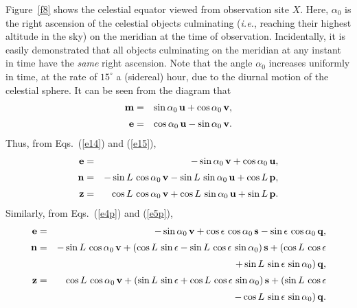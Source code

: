 Figure~\ref{f8} shows the celestial equator viewed from observation site $X$. Here, $\alpha_0$ is
the right ascension of the celestial objects culminating ({\em i.e.}, reaching
their highest altitude in the sky) on the meridian at the time of observation. Incidentally, it is
easily demonstrated that all objects culminating on the meridian at
any instant in time have the {\em same}\/ right ascension. Note that the angle $\alpha_0$
increases uniformly in time, at the rate of $15^\circ$ a (sidereal) hour, due to the diurnal motion of the celestial
sphere. It can be seen from the diagram that
\begin{eqnarray}
{\bf m} &=& \sin \alpha_0\,{\bf u} + \cos \alpha_0\,{\bf v},\\[0.5ex]
{\bf e} &=&\cos \alpha_0 \,{\bf u} -\sin \alpha_0\,{\bf v}.\label{e17}
\end{eqnarray}
Thus, from Eqs.~(\ref{e14}) and (\ref{e15}),
\begin{eqnarray}
{\bf e} &=& -\sin \alpha_0\,{\bf v} + \cos \alpha_0\,{\bf u},\\[0.5ex]
{\bf n} &=& -\sin L\,\cos \alpha_0\,{\bf v} - \sin L\,\sin \alpha_0\,{\bf u} + \cos L\,{\bf p},\label{xx}\\[0.5ex]
{\bf z} &=& \cos L\,\cos \alpha_0\,{\bf v} + \cos L\,\sin \alpha_0\,{\bf u} + \sin L\,{\bf p}.\label{zz}
\end{eqnarray}
Similarly, from Eqs.~(\ref{e4p}) and (\ref{e5p}),
\begin{eqnarray}
{\bf e}&=& -\sin \alpha_0\,{\bf v} + \cos\epsilon\,\cos \alpha_0\,{\bf s} - \sin\epsilon\,\cos \alpha_0\,{\bf q},\label{e25w}\\[0.5ex]
{\bf n} &=& -\sin L\,\cos \alpha_0\,{\bf v} + (\cos L\,\sin \epsilon-\sin L\,\cos \epsilon\,\sin \alpha_0)\,{\bf s} + (\cos L\,\cos \epsilon\nonumber\\[0.5ex] &&+\sin L\,\sin \epsilon\,\sin \alpha_0)\,{\bf q},\label{e24w}\\[0.5ex]
{\bf z} &=& \cos L\,\cos \alpha_0\,{\bf v} + (\sin L\,\sin\epsilon + \cos L\,\cos\epsilon\,\sin \alpha_0)\,{\bf s} + (\sin L\,\cos\epsilon\nonumber\\[0.5ex]&&-\cos L\,\sin\epsilon\,\sin \alpha_0)\,{\bf q}.\label{e26w}
\end{eqnarray}

